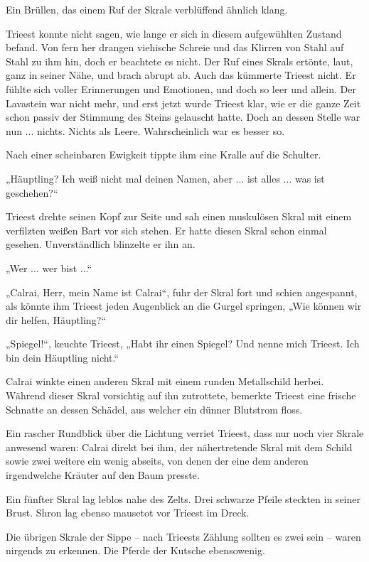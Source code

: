 Ein Brüllen, das einem Ruf der Skrale verblüffend ähnlich klang.

Trieest konnte nicht sagen, wie lange er sich in diesem aufgewühlten Zustand befand. Von fern her drangen viehische Schreie und das Klirren von Stahl auf Stahl zu ihm hin, doch er beachtete es nicht. Der Ruf eines Skrals ertönte, laut, ganz in seiner Nähe, und brach abrupt ab. Auch das kümmerte Trieest nicht. Er fühlte sich voller Erinnerungen und Emotionen, und doch so leer und allein. Der Lavastein war nicht mehr, und erst jetzt wurde Trieest klar, wie er die ganze Zeit schon passiv der Stimmung des Steins gelauscht hatte. Doch an dessen Stelle war nun ... nichts. Nichts als Leere. Wahrscheinlich war es besser so.

Nach einer scheinbaren Ewigkeit tippte ihm eine Kralle auf die Schulter.

„Häuptling? Ich weiß nicht mal deinen Namen, aber ... ist alles ... was ist geschehen?“

Trieest drehte seinen Kopf zur Seite und sah einen muskulösen Skral mit einem verfilzten weißen Bart vor sich stehen. Er hatte diesen Skral schon einmal gesehen. Unverständlich blinzelte er ihn an.

„Wer ... wer bist ...“

„Calrai, Herr, mein Name ist Calrai“, fuhr der Skral fort und schien angespannt, als könnte ihm Trieest jeden Augenblick an die Gurgel springen, „Wie können wir dir helfen, Häuptling?“

„Spiegel!“, keuchte Trieest, „Habt ihr einen Spiegel? Und nenne mich Trieest. Ich bin dein Häuptling nicht.“

Calrai winkte einen anderen Skral mit einem runden Metallschild herbei. Während dieser Skral vorsichtig auf ihn zutrottete, bemerkte Trieest eine frische Schnatte an dessen Schädel, aus welcher ein dünner Blutstrom floss.

Ein rascher Rundblick über die Lichtung verriet Trieest, dass nur noch vier Skrale anwesend waren: Calrai direkt bei ihm, der nähertretende Skral mit dem Schild sowie zwei weitere ein wenig abseits, von denen der eine dem anderen irgendwelche Kräuter auf den Baum presste.

Ein fünfter Skral lag leblos nahe des Zelts. Drei schwarze Pfeile steckten in seiner Brust. Shron lag ebenso mausetot vor Trieest im Dreck.

Die übrigen Skrale der Sippe – nach Trieests Zählung sollten es zwei sein – waren nirgends zu erkennen. Die Pferde der Kutsche ebensowenig.

